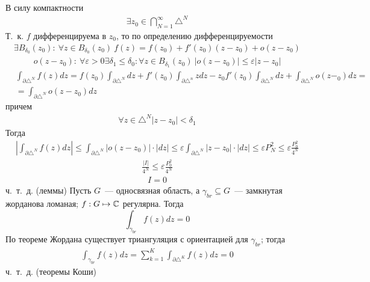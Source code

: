 В силу компактности
\begin{align*}
  \exists z_0 \in \bigcap_{N=1}^{\infty}\triangle^N
\end{align*}
Т.~к. $f$ дифференцируема в $z_0$, то по определению дифференцируемости
\begin{align*}
  \exists B_{\delta_0}(z_0): \ \forall z \in B_{\delta_0}(z_0) \ f(z) = f(z_0)+f'(z_0)(z-z_0) + o(z-z_0)
\end{align*}
\begin{align*}
  o(z-z_0): \ \forall \varepsilon > 0 \exists \delta_1 \leq \delta_0: \forall z \in B_{\delta_1}(z_0) \ \left| o(z-z_0) \right| \leq \varepsilon\left| z-z_0 \right|
\end{align*}
\begin{align*}
  & \int_{\partial \triangle^N}f(z)dz = f(z_0)\int_{\partial \triangle^N}dz+f'(z_0)\int_{\partial \triangle^n}zdz - z_0 f'(z_0)\int_{\partial \triangle^N} dz + \int_{\partial \triangle^N}o(z-_0)dz = \\
  & = \int_{\partial \triangle^N}o(z-z_0)dz
\end{align*}
причем
\begin{align*}
  \forall z \in \triangle^N \left| z-z_0 \right| < \delta_1
\end{align*}
Тогда
\begin{align*}
  \left| \int_{\partial \triangle^N}f(z)dz \right| \leq \int_{\partial \triangle^N} \left| o(z-z_0) \right|\cdot \left| dz \right| \leq \varepsilon\int_{\partial\triangle^N}\left| z-z_0 \right|\cdot\left| dz \right| \leq \varepsilon P^2_N \leq \varepsilon \frac{P^2_0}{4^N}
\end{align*}
\begin{align*}
  \frac{\left| I \right|}{4^N} \leq \varepsilon \frac{P^2_0}{4^N}
\end{align*}
\begin{align*}
  I = 0
\end{align*}
ч.~т.~д.
\corollary (леммы)
Пусть $G$~--- односвязная область, а $\gamma_{br} \subseteq
G$~--- замкнутая жорданова ломаная; $f:G \mapsto \mathbb{C}$ регулярна. Тогда
\begin{equation} \label{(7.3)}
  \int_{\gamma_{br}} f(z)dz = 0
\end{equation}
\pr
По теореме Жордана существует триангуляция с ориентацией для $\gamma_{br}$;
тогда 
\begin{align*}
  \int_{\gamma_{br}} f(z)dz = \sum_{k=1}^K\int_{\partial\triangle^K}f(z)dz = 0
\end{align*}
ч.~т.~д.
\pr (теоремы Коши)
